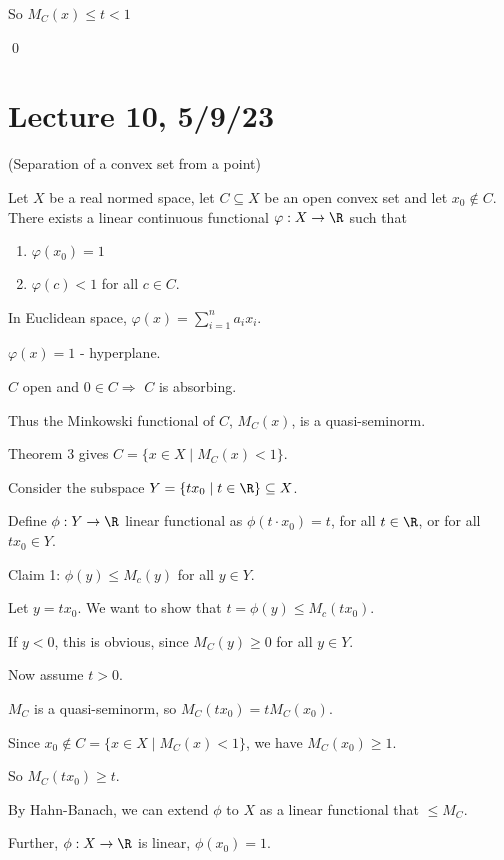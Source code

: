 \documentclass[x11names,reqno,14pt]{extarticle}
\begin{document}
So $M_C(x)\leq t < 1$

\qed

\section*{Lecture 10, 5/9/23}

\thm (Separation of a convex set from a point)

Let $X$ be a real normed space, let $C \subseteq X$ be an open convex set and let $x_0\not\in C$. There exists a linear continuous functional $\varphi:X\to\R$ such that
\begin{enumerate}

\item $\varphi(x_0) = 1$

\item $\varphi(c) < 1$ for all $c \in C$. 

\end{enumerate}

In Euclidean space, $\varphi(x) = \sum_{i=1}^na_ix_i$.

$\varphi(x) = 1$ - hyperplane. 

\proof

$C$ open and $0 \in C \Rightarrow$ $C$ is absorbing. 

Thus the Minkowski functional of $C$, $M_C(x)$, is a quasi-seminorm. 

Theorem 3 gives $C = \{x\in X \mid M_C(x) < 1\}$. 

Consider the subspace $Y = \{tx_0 \mid t\in \R\}\subseteq X$. 

Define $\phi:Y\to\R$ linear functional as $\phi(t\cdot x_0) = t$, for all $t \in \R$, or for all $tx_0 \in Y$. 

Claim 1: $\phi(y) \leq M_c(y)$ for all $y \in Y$. 

Let $y = tx_0$. We want to show that $t = \phi(y) \leq M_c(tx_0)$. 

If $y < 0$, this is obvious, since $M_C(y) \geq 0$ for all $y \in Y$. 

Now assume $t > 0$. 

$M_C$ is a quasi-seminorm, so $M_C(tx_0) = tM_C(x_0)$. 

Since $x_0\not\in C = \{x\in X \mid M_C(x)<1\}$, we have $M_C(x_0)\geq 1$. 

So $M_C(tx_0) \geq t$. 

By Hahn-Banach, we can extend $\phi$ to $X$ as a linear functional that $\leq M_C$. 

Further, $\phi:X\to\R$ is linear, $\phi(x_0) = 1$. 
\end{document}
